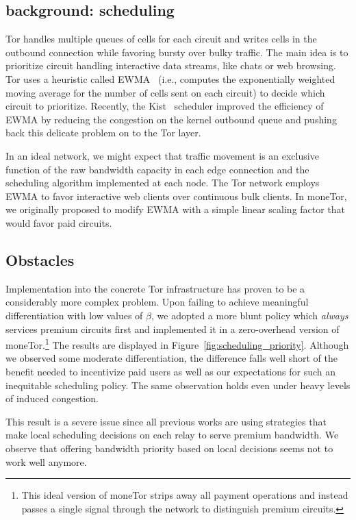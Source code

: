 \subsection{background: scheduling}

Tor handles multiple queues of cells for each circuit and writes cells in the outbound connection while favoring bursty over bulky traffic.
The main idea is to prioritize circuit handling interactive data streams, like chats or web browsing.
Tor uses a heuristic called EWMA~\cite{tang2010improved} (i.e., computes the exponentially weighted moving average for the number of cells sent on each circuit) to decide which circuit to prioritize.
Recently, the Kist~\cite{jansen2014never} scheduler improved the efficiency of EWMA by reducing the congestion on the kernel outbound queue and pushing back this delicate problem on to the Tor layer.

In an ideal network, we might expect that traffic movement is an exclusive function of the raw bandwidth capacity in each edge connection and the scheduling algorithm implemented at each node.
The Tor network employs EWMA to favor interactive web clients over continuous bulk clients.
In moneTor, we originally proposed to modify EWMA with a simple linear scaling factor that would favor paid circuits.

\subsection{Obstacles}

Implementation into the concrete Tor infrastructure has proven to be a considerably more complex problem.
Upon failing to achieve meaningful differentiation with low values of $\beta$, we adopted a more blunt policy which \emph{always} services premium circuits first and implemented it in a zero-overhead version of moneTor.\footnote{This ideal version of moneTor strips away all payment operations and instead passes a single signal through the network to distinguish premium circuits.}
The results are displayed in Figure~\ref{fig:scheduling_priority}.
Although we observed some moderate differentiation, the difference falls well short of the benefit needed to incentivize paid users as well as our expectations for such an inequitable scheduling policy.
The same observation holds even under heavy levels of induced congestion.

This result is a severe issue since all previous works are using strategies that make local scheduling decisions on each relay to serve premium bandwidth.
We observe that offering bandwidth priority based on local decisions seems not to work well anymore.

